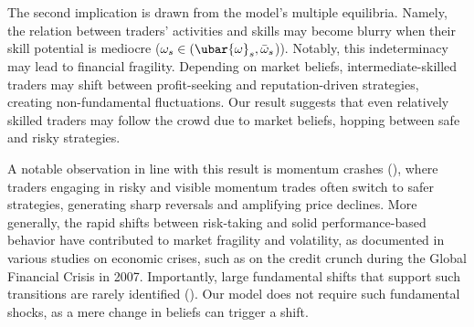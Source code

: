 The second implication is drawn from the model's multiple equilibria. Namely, the relation between traders' activities and skills may become blurry when their skill potential is mediocre ($\omega_{s}\in (\ubar{\omega}_{s}, \bar{\omega}_{s}$)). Notably, this indeterminacy may lead to financial fragility. Depending on market beliefs, intermediate-skilled traders may shift between profit-seeking and reputation-driven strategies, creating non-fundamental fluctuations. Our result suggests that even relatively skilled traders may follow the crowd due to market beliefs, hopping between safe and risky strategies. 

A notable observation in line with this result is momentum crashes (\citealp{daniel2016momentum}), where traders engaging in risky and visible momentum trades often switch to safer strategies, generating sharp reversals and amplifying price declines. More generally, the rapid shifts between risk-taking and solid performance-based behavior have contributed to market fragility and volatility, as documented in various studies on economic crises, such as \citet{brunnermeier2009deciphering} on the credit crunch during the Global Financial Crisis in 2007. Importantly, large fundamental shifts that support such transitions are rarely identified (\citealp{gennotte1999market}). Our model does not require such fundamental shocks, as a mere change in beliefs can trigger a shift.



